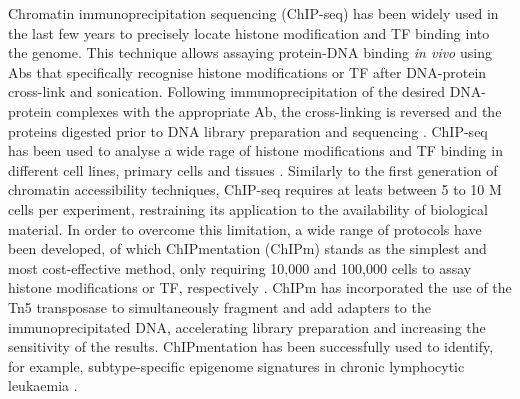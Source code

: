 Chromatin immunoprecipitation sequencing (ChIP-seq) has been widely used in the last few years to precisely locate histone modification and TF binding into the genome. This technique allows assaying protein-DNA binding \textit{in vivo} using Abs that specifically recognise histone modifications or TF after DNA-protein cross-link and sonication. Following immunoprecipitation of the desired DNA-protein complexes with the appropriate Ab, the cross-linking is reversed and the proteins digested prior to DNA library preparation and sequencing \parencite{Solomon1988,Barski2007,Johnson2007}. ChIP-seq has been used to analyse a wide rage of histone modifications and TF binding in different cell lines, primary cells and tissues \parencite{ENCODE2012,Bernstein2010,Adams2012}. Similarly to the first generation of chromatin accessibility techniques, ChIP-seq requires at leats between 5 to 10 M cells per experiment, restraining its application to the availability of biological material. In order to overcome this limitation, a wide range of protocols have been developed, of which ChIPmentation (ChIPm) stands as the simplest and most cost-effective method, only requiring 10,000 and 100,000 cells to assay histone modifications or TF, respectively \parencite{Schmidl2015}. ChIPm has incorporated the use of the Tn5 transposase to simultaneously fragment and add adapters to the immunoprecipitated DNA, accelerating library preparation and increasing the sensitivity of the results. ChIPmentation has been successfully used to identify, for example, subtype-specific epigenome signatures in chronic lymphocytic leukaemia \parencite{Rendeiro2015}.

 

